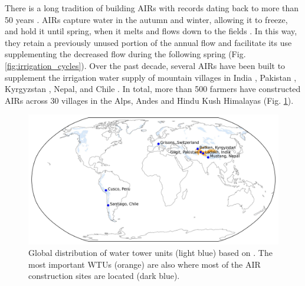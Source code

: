 There is a long tradition of building \ac{AIRs} with records dating back to more than 50 years
\citep{nusserSociohydrologyArtificialGlaciers2019}. \ac{AIRs} capture water in the autumn and winter, allowing
it to freeze, and hold it until spring, when it melts and flows down to the fields
\citep{ipccChapterHighMountain2019, vinceGlacierMan2009, clouseLadakhArtificialGlaciers2017,
nusserSociohydrologyArtificialGlaciers2019}. In this way, they retain a previously unused portion of the annual
flow and facilitate its use supplementing the decreased flow during the following spring (Fig.
\ref{fig:irrigation_cycles}). Over the past decade, several \ac{AIRs} have been built to supplement the
irrigation water supply of mountain villages in India \citep{wangchukIceStupaCompetition2020,
palmerStoringFrozenWater2022, aggarwalAdaptationClimateChange2021}, Pakistan
\citep{awazproductionIceStupaArtificial2022}, Kyrgyzstan \citep{bbcnewsBrightArtificialGlacier2020}, Nepal, and
Chile \citep{reutersConservationistsChileAim2021}. In total, more than 500 farmers have constructed AIRs across
30 villages in the Alps, Andes and Hindu Kush Himalayas (Fig. \ref{fig:WTUs_AIRs}).

\begin{figure}[htb]
	\centering
	\includegraphics[width=\textwidth]{figs/WTUs_AIRs.jpg}

	\caption{ Global distribution of water tower units (light blue) based on
		\citet{immerzeelImportanceVulnerabilityWorld2020}. The most important \ac{WTUs} (orange) are also where most of
		the AIR construction sites  are located (dark blue). }

	\label{fig:WTUs_AIRs}
\end{figure}

